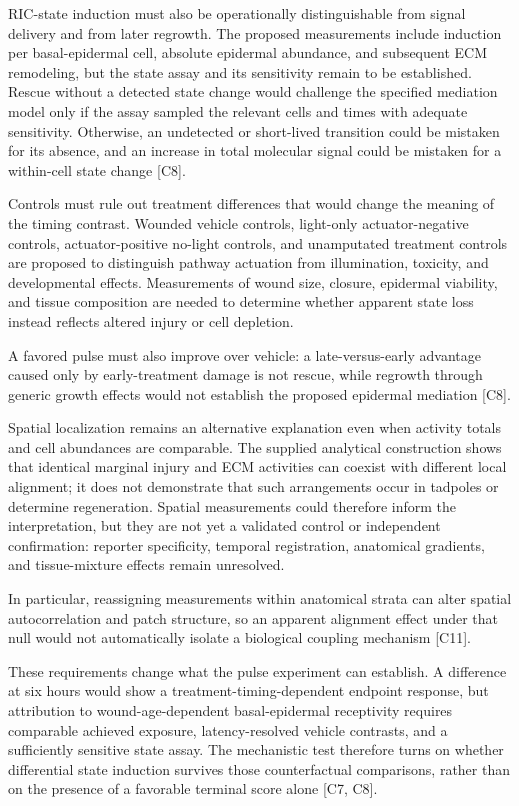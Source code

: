 \documentclass[11pt]{article}
\begin{document}
RIC-state induction must also be operationally distinguishable from signal delivery and from later regrowth. The proposed measurements include induction per basal-epidermal cell, absolute epidermal abundance, and subsequent ECM remodeling, but the state assay and its sensitivity remain to be established. Rescue without a detected state change would challenge the specified mediation model only if the assay sampled the relevant cells and times with adequate sensitivity. Otherwise, an undetected or short-lived transition could be mistaken for its absence, and an increase in total molecular signal could be mistaken for a within-cell state change [C8].

Controls must rule out treatment differences that would change the meaning of the timing contrast. Wounded vehicle controls, light-only actuator-negative controls, actuator-positive no-light controls, and unamputated treatment controls are proposed to distinguish pathway actuation from illumination, toxicity, and developmental effects. Measurements of wound size, closure, epidermal viability, and tissue composition are needed to determine whether apparent state loss instead reflects altered injury or cell depletion.

A favored pulse must also improve over vehicle: a late-versus-early advantage caused only by early-treatment damage is not rescue, while regrowth through generic growth effects would not establish the proposed epidermal mediation [C8].

Spatial localization remains an alternative explanation even when activity totals and cell abundances are comparable. The supplied analytical construction shows that identical marginal injury and ECM activities can coexist with different local alignment; it does not demonstrate that such arrangements occur in tadpoles or determine regeneration. Spatial measurements could therefore inform the interpretation, but they are not yet a validated control or independent confirmation: reporter specificity, temporal registration, anatomical gradients, and tissue-mixture effects remain unresolved.

In particular, reassigning measurements within anatomical strata can alter spatial autocorrelation and patch structure, so an apparent alignment effect under that null would not automatically isolate a biological coupling mechanism [C11].

These requirements change what the pulse experiment can establish. A difference at six hours would show a treatment-timing-dependent endpoint response, but attribution to wound-age-dependent basal-epidermal receptivity requires comparable achieved exposure, latency-resolved vehicle contrasts, and a sufficiently sensitive state assay. The mechanistic test therefore turns on whether differential state induction survives those counterfactual comparisons, rather than on the presence of a favorable terminal score alone [C7, C8].
\end{document}
